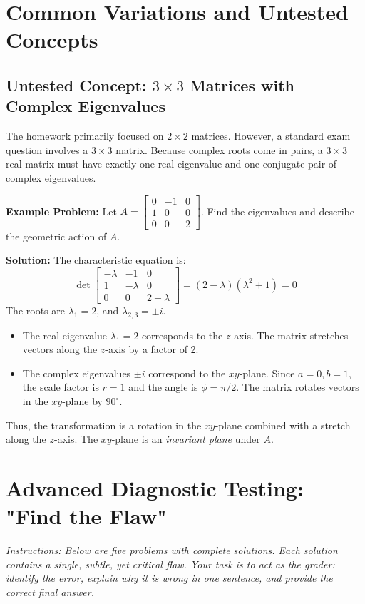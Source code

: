 \documentclass[11pt, letterpaper]{article}
\theoremstyle{definition}
\theoremstyle{remark}
\begin{document}
\newpage

\section{Common Variations and Untested Concepts}

\subsection{Untested Concept: $3 \times 3$ Matrices with Complex Eigenvalues}
The homework primarily focused on $2 \times 2$ matrices. However, a standard exam question involves a $3 \times 3$ matrix. Because complex roots come in pairs, a $3 \times 3$ real matrix must have exactly one real eigenvalue and one conjugate pair of complex eigenvalues.

\textbf{Example Problem:} Let $A = \begin{bmatrix} 0 & -1 & 0 \\ 1 & 0 & 0 \\ 0 & 0 & 2 \end{bmatrix}$. Find the eigenvalues and describe the geometric action of $A$.

\textbf{Solution:}
The characteristic equation is:
\[
\det \begin{bmatrix} -\lambda & -1 & 0 \\ 1 & -\lambda & 0 \\ 0 & 0 & 2 - \lambda \end{bmatrix} = (2 - \lambda)(\lambda^2 + 1) = 0
\]
The roots are $\lambda_1 = 2$, and $\lambda_{2,3} = \pm i$.
\begin{itemize}
    \item The real eigenvalue $\lambda_1 = 2$ corresponds to the $z$-axis. The matrix stretches vectors along the $z$-axis by a factor of 2.
    \item The complex eigenvalues $\pm i$ correspond to the $xy$-plane. Since $a=0, b=1$, the scale factor is $r=1$ and the angle is $\phi = \pi/2$. The matrix rotates vectors in the $xy$-plane by $90^\circ$.
\end{itemize}
Thus, the transformation is a rotation in the $xy$-plane combined with a stretch along the $z$-axis. The $xy$-plane is an \textit{invariant plane} under $A$.

\newpage

\section{Advanced Diagnostic Testing: "Find the Flaw"}
\textit{Instructions: Below are five problems with complete solutions. Each solution contains a single, subtle, yet critical flaw. Your task is to act as the grader: identify the error, explain why it is wrong in one sentence, and provide the correct final answer.}
\end{document}
